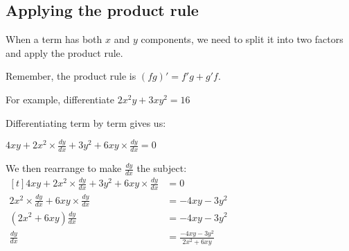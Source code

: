 \documentclass[../main.tex]{subfiles}
\begin{document}
\subsection*{Applying the product rule}
When a term has both \(x\) and \(y\) components, we need to split it into two factors and apply the product rule.

Remember, the product rule is \( (fg)' = f'g +g'f\).

For example, differentiate \(2x^2y+3xy^2=16\)

Differentiating term by term gives us:

\(4xy + 2x^2\times\frac{dy}{dx}+3y^2+6xy\times\frac{dy}{dx}=0\)

We then rearrange to make \(\frac{dy}{dx}\) the subject:
    $
    \!
    \begin{aligned}[t]
     4xy + 2x^2\times\frac{dy}{dx}+3y^2+6xy\times\frac{dy}{dx}
        &= 0 \\
     2x^2\times\frac{dy}{dx}+6xy\times\frac{dy}{dx}
        &= -4xy-3y^2 \\
    (2x^2+6xy)\frac{dy}{dx}
        &= -4xy-3y^2 \\
    \frac{dy}{dx}
        &= \frac{-4xy-3y^2}{2x^2+6xy}
    \end{aligned}
    $

\pagebreak
\end{document}
